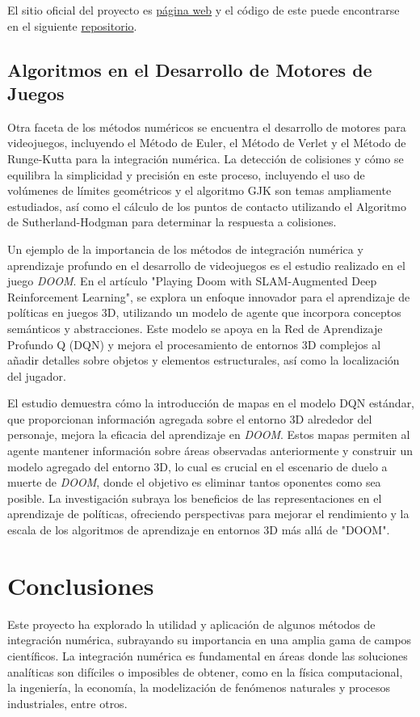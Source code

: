 \documentclass[a4paper]{article}
\begin{document}
    El sitio oficial del proyecto es \href{https://www.opengeosys.org/#:~:text=OpenGeoSys%20,the%20fields%20of%20regionals}{página web} y el código de este puede encontrarse en el siguiente \href{https://gitlab.opengeosys.org/ogs/ogs}{repositorio}.
    
    \subsection{Algoritmos en el Desarrollo de Motores de Juegos}
    Otra faceta de los métodos numéricos se encuentra el desarrollo de motores para videojuegos, incluyendo el Método de Euler, el Método de Verlet y el Método de Runge-Kutta para la integración numérica. La detección de colisiones y cómo se equilibra la simplicidad y precisión en este proceso, incluyendo el uso de volúmenes de límites geométricos y el algoritmo GJK son temas ampliamente estudiados, así como el cálculo de los puntos de contacto utilizando el Algoritmo de Sutherland-Hodgman para determinar la respuesta a colisiones.\cite{serranoalgos}
    
    Un ejemplo de la importancia de los métodos de integración numérica y aprendizaje profundo en el desarrollo de videojuegos es el estudio realizado en el juego \textit{DOOM}. En el artículo "Playing Doom with SLAM-Augmented Deep Reinforcement Learning", se explora un enfoque innovador para el aprendizaje de políticas en juegos 3D, utilizando un modelo de agente que incorpora conceptos semánticos y abstracciones. Este modelo se apoya en la Red de Aprendizaje Profundo Q (DQN) y mejora el procesamiento de entornos 3D complejos al añadir detalles sobre objetos y elementos estructurales, así como la localización del jugador. 

    El estudio demuestra cómo la introducción de mapas en el modelo DQN estándar, que proporcionan información agregada sobre el entorno 3D alrededor del personaje, mejora la eficacia del aprendizaje en \textit{DOOM}. Estos mapas permiten al agente mantener información sobre áreas observadas anteriormente y construir un modelo agregado del entorno 3D, lo cual es crucial en el escenario de duelo a muerte de \textit{DOOM}, donde el objetivo es eliminar tantos oponentes como sea posible. La investigación subraya los beneficios de las representaciones en el aprendizaje de políticas, ofreciendo perspectivas para mejorar el rendimiento y la escala de los algoritmos de aprendizaje en entornos 3D más allá de "DOOM".\cite{doommethods}
     
    \section{Conclusiones}
    \label{sec:Conclusiones}
    Este proyecto ha explorado la utilidad y aplicación de algunos métodos de integración numérica, subrayando su importancia en una amplia gama de campos científicos. La integración numérica es fundamental en áreas donde las soluciones analíticas son difíciles o imposibles de obtener, como en la física computacional, la ingeniería, la economía, la modelización de fenómenos naturales y procesos industriales, entre otros.
\end{document}

